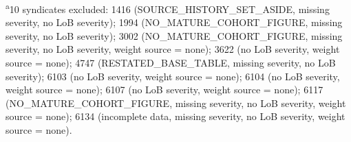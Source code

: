 \begin{table}[htbp]
\begin{tabular}{lrr}
\bottomrule
\end{tabular}
\vspace{2pt}\par\noindent\textsuperscript{a}\footnotesize 10 syndicates excluded: 1416 (SOURCE_HISTORY_SET_ASIDE, missing severity, no LoB severity); 1994 (NO_MATURE_COHORT_FIGURE, missing severity, no LoB severity); 3002 (NO_MATURE_COHORT_FIGURE, missing severity, no LoB severity, weight source = none); 3622 (no LoB severity, weight source = none); 4747 (RESTATED_BASE_TABLE, missing severity, no LoB severity); 6103 (no LoB severity, weight source = none); 6104 (no LoB severity, weight source = none); 6107 (no LoB severity, weight source = none); 6117 (NO_MATURE_COHORT_FIGURE, missing severity, no LoB severity, weight source = none); 6134 (incomplete data, missing severity, no LoB severity, weight source = none).
\end{table}
